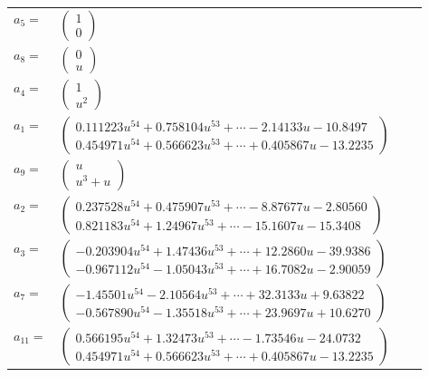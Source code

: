 \documentclass[1p]{elsarticle_modified}
\theoremstyle{definition}
\begin{document}
\begin{tabular}{m{7pt} m{180pt} m{7pt} m{180pt} }
\flushright $a_{5}=$&$\begin{pmatrix}1\\0\end{pmatrix}$ \\
\flushright $a_{8}=$&$\begin{pmatrix}0\\u\end{pmatrix}$ \\
\flushright $a_{4}=$&$\begin{pmatrix}1\\u^2\end{pmatrix}$ \\
\flushright $a_{1}=$&$\begin{pmatrix}0.111223 u^{54}+0.758104 u^{53}+\cdots-2.14133 u-10.8497\\0.454971 u^{54}+0.566623 u^{53}+\cdots+0.405867 u-13.2235\end{pmatrix}$ \\
\flushright $a_{9}=$&$\begin{pmatrix}u\\u^3+u\end{pmatrix}$ \\
\flushright $a_{2}=$&$\begin{pmatrix}0.237528 u^{54}+0.475907 u^{53}+\cdots-8.87677 u-2.80560\\0.821183 u^{54}+1.24967 u^{53}+\cdots-15.1607 u-15.3408\end{pmatrix}$ \\
\flushright $a_{3}=$&$\begin{pmatrix}-0.203904 u^{54}+1.47436 u^{53}+\cdots+12.2860 u-39.9386\\-0.967112 u^{54}-1.05043 u^{53}+\cdots+16.7082 u-2.90059\end{pmatrix}$ \\
\flushright $a_{7}=$&$\begin{pmatrix}-1.45501 u^{54}-2.10564 u^{53}+\cdots+32.3133 u+9.63822\\-0.567890 u^{54}-1.35518 u^{53}+\cdots+23.9697 u+10.6270\end{pmatrix}$ \\
\flushright $a_{11}=$&$\begin{pmatrix}0.566195 u^{54}+1.32473 u^{53}+\cdots-1.73546 u-24.0732\\0.454971 u^{54}+0.566623 u^{53}+\cdots+0.405867 u-13.2235\end{pmatrix}$ \\

\end{tabular}
\end{document}
